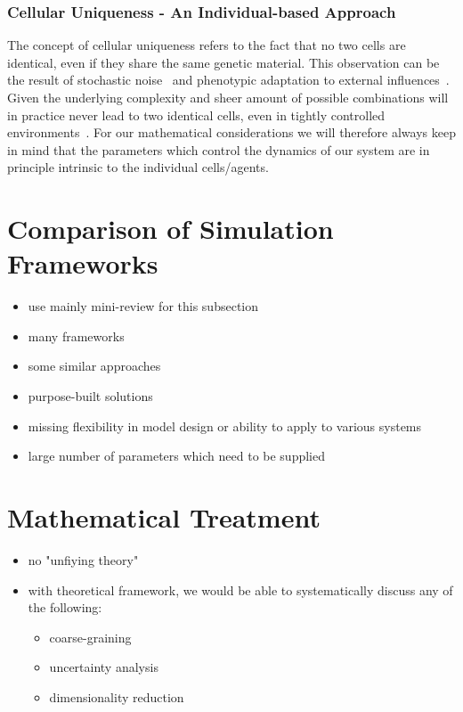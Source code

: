 \subsubsection{Cellular Uniqueness - An Individual-based Approach}
The concept of cellular uniqueness refers to the fact that no two cells are identical, even if they
share the same genetic material.
This observation can be the result of stochastic noise~\cite{Swain2002,Raj2008} and phenotypic
adaptation to external influences~\cite{WestEberhard1989,Price2003}.
Given the underlying complexity and sheer amount of possible combinations will in practice never
lead to two identical cells, even in tightly controlled environments~\cite{Spudich1976,Lestas2010}.
For our mathematical considerations we will therefore always keep in mind that the parameters which
control the dynamics of our system are in principle intrinsic to the individual cells/agents.


\section{Comparison of Simulation Frameworks}
\begin{itemize}
    \item use mainly mini-review for this subsection \cite{Pleyer2023}
    \item many frameworks
    \item some similar approaches
    \item purpose-built solutions
    \item missing flexibility in model design or ability to apply to various systems
    \item large number of parameters which need to be supplied
\end{itemize}

\section{Mathematical Treatment}
\begin{itemize}
    \item no "unfiying theory"
    \item with theoretical framework, we would be able to systematically discuss any of
        the following:
        \begin{itemize}
            \item coarse-graining
            \item uncertainty analysis
            \item dimensionality reduction
        \end{itemize}
\end{itemize}

